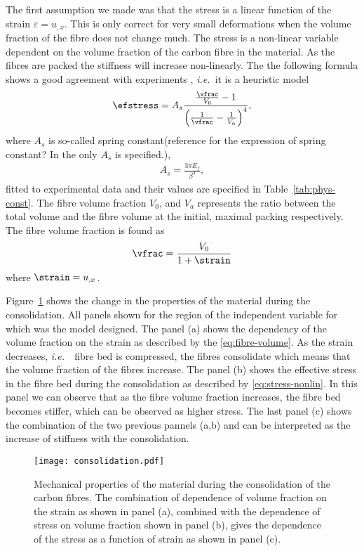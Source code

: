 \documentclass[twoside,a4paper,12pt]{article}
\newcommand{\figref}[1]{Figure~\ref{#1}}
\newcommand{\tabref}[1]{Table~\ref{#1}}
\newcommand{\ie}{{\it i.e.\ }}
\newcommand{\note}[1]{{\color{red}(#1)}}
\begin{document}
The first assumption we made was that the stress is a linear function
of the strain $\varepsilon = u_{,x}$. This is only correct for very
small deformations when the volume fraction of the fibre does not
change much.  The stress is a non-linear variable dependent on the
volume fraction of the carbon fibre in the material. As the fibres are
packed the stiffness will increase non-linearly. The the following
formula shows a good agreement with experiments \citet{Gutowski1987},
\ie it is a heuristic model
% 
\begin{align}
  \efstress = A_s
  \frac{\frac{\vfrac}{V_0} -1}{\left(\frac{1}{\vfrac} -\frac{1}{V_a}\right)^4}, \label{eq:stress-nonlin}
\end{align}
%
where $A_s$ is so-called spring constant\note{reference for the expression of spring constant? In the \citet{Gutowski1987} only $A_s$ is specified.},
%
\begin{align}
  A_s = \frac{3\pi E_f}{\beta^4},
\end{align}
%
fitted to experimental data and their values are specified in
\tabref{tab:phys-const}.
%
The fibre volume fraction $V_0$, and $V_a$ represents the ratio
between the total volume and the fibre volume at the initial, maximal
packing respectively. The fibre volume fraction is found as
%
\begin{align}
  \vfrac = \frac{V_0}{1+\strain} \label{eq:fibre-volume}
\end{align}
%
where $\strain =  u_{,x}$.

\figref{fig:consolidation} shows the change in the properties of the material during the consolidation. All panels shown for the region of the independent variable for which was the model designed. The panel (a) shows the dependency of the volume fraction on the strain as described by the \eqref{eq:fibre-volume}. As the strain decreases, \ie\ fibre bed is compressed, the fibres consolidate which means that the volume fraction of the fibres increase. The panel (b) shows the effective stress in the fibre bed during the consolidation as described by \eqref{eq:stress-nonlin}. In this panel we can observe that as the fibre volume fraction increases, the fibre bed becomes stiffer, which can be observed as higher stress. The last panel (c) shows the combination of the two previous pannels (a,b) and can be interpreted as the increase of stiffness with the consolidation.
%
\begin{figure}
  \centering
  \texttt{[image: consolidation.pdf]}
  \caption{Mechanical properties of the material during the consolidation of the carbon fibres. The combination of dependence of volume fraction on the strain as shown in panel (a), combined with the dependence of stress on volume fraction shown in panel (b), gives the dependence of the stress as a function of strain as shown in panel (c).}
  \label{fig:consolidation}
\end{figure}
\end{document}
